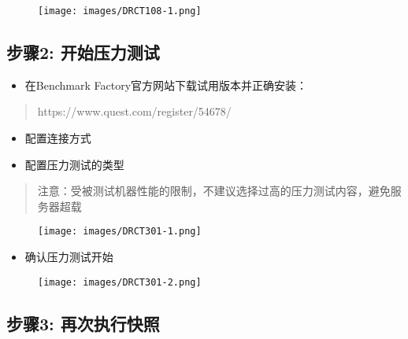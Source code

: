 \begin{figure}[htbp]
\centering
\texttt{[image: images/DRCT108-1.png]}
\end{figure}

\subsection{步骤2: 开始压力测试}
\label{步骤2:开始压力测试}

\begin{itemize}
\item 在Benchmark Factory官方网站下载试用版本并正确安装：

\end{itemize}

\begin{quote}

https:\slash \slash www.quest.com\slash register\slash 54678\slash 
\end{quote}

\begin{itemize}
\item 配置连接方式

\item 配置压力测试的类型

\end{itemize}

\begin{quote}

注意：受被测试机器性能的限制，不建议选择过高的压力测试内容，避免服务器超载
\end{quote}

\begin{figure}[htbp]
\centering
\texttt{[image: images/DRCT301-1.png]}
\end{figure}

\begin{itemize}
\item 确认压力测试开始

\end{itemize}

\begin{figure}[htbp]
\centering
\texttt{[image: images/DRCT301-2.png]}
\end{figure}

\subsection{步骤3: 再次执行快照}
\label{步骤3:再次执行快照}

